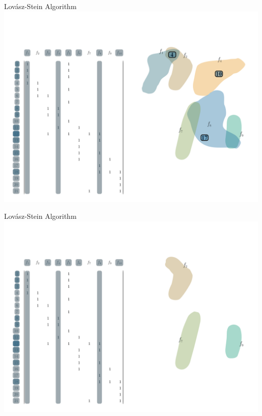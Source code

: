\documentclass[10pt]{beamer}
\begin{document}
\begin{frame}[fragile]{Lovász-Stein Algorithm}
    \vspace*{-3em}\hspace*{-2em}\includegraphics[width=1.15\textwidth]{Images/LSAExample/11}
\end{frame}

\begin{frame}[fragile]{Lovász-Stein Algorithm}
    \vspace*{-3em}\hspace*{-2em}\includegraphics[width=1.15\textwidth]{Images/LSAExample/12}
\end{frame}
\end{document}
